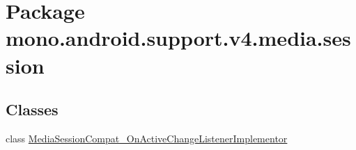 \hypertarget{namespacemono_1_1android_1_1support_1_1v4_1_1media_1_1session}{
\section{Package mono.android.support.v4.media.session}
\label{namespacemono_1_1android_1_1support_1_1v4_1_1media_1_1session}
}
\subsection*{Classes}
\begin{CompactItemize}
\item 
class \hyperlink{classmono_1_1android_1_1support_1_1v4_1_1media_1_1session_1_1_media_session_compat___on_active_change_listener_implementor}{MediaSessionCompat\_\-OnActiveChangeListenerImplementor}
\end{CompactItemize}
